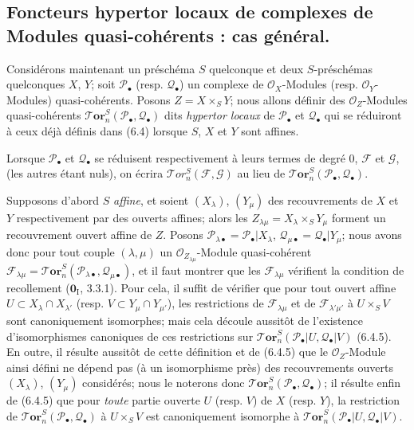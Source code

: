 \subsection{Foncteurs hypertor locaux de complexes de Modules quasi-cohérents : cas général.}

\begin{env}[6.5.1]
Considérons maintenant un préschéma $S$ quelconque et deux $S$-préschémas
quelconques $X$, $Y$; soit $\mathscr P_\bullet$ (resp. $\mathscr Q_\bullet$)
un complexe de $\mathscr O_X$-Modules (resp. $\mathscr O_Y$-Modules)
quasi-cohérents. Posons $Z=X\times_S Y$; nous allons définir des
$\mathscr O_Z$-Modules quasi-cohérents
$\boldsymbol{\mathscr{T}\!or}_n^S(\mathscr P_\bullet,\mathscr Q_\bullet)$ dits
\emph{hypertor locaux} de $\mathscr P_\bullet$ et $\mathscr Q_\bullet$ qui se
réduiront à ceux déjà définis dans (6.4) lorsque $S$, $X$ et $Y$ sont affines.

Lorsque $\mathscr P_\bullet$ et $\mathscr Q_\bullet$ se réduisent
respectivement à leurs termes de degré 0, $\mathscr F$ et $\mathscr G$, (les
autres étant nuls), on écrira
$\mathscr{T}\!or_n^S(\mathscr F,\mathscr G)$ au lieu de
$\boldsymbol{\mathscr{T}\!or}_n^S(\mathscr P_\bullet,\mathscr Q_\bullet)$.
\end{env}

\begin{env}[6.5.2]
Supposons d'abord $S$ \emph{affine}, et soient $(X_\lambda)$, $(Y_\mu)$ des
recouvrements de $X$ et $Y$ respectivement par des ouverts affines; alors les
$Z_{\lambda\mu}=X_\lambda\times_S Y_\mu$ forment un recouvrement ouvert affine
de $Z$. Posons
$\mathscr P_{\lambda\bullet}=\mathscr P_\bullet|X_\lambda$,
$\mathscr Q_{\mu\bullet}=\mathscr Q_\bullet|Y_\mu$; nous avons donc pour tout
couple $(\lambda,\mu)$ un $\mathscr O_{Z_{\lambda\mu}}$-Module quasi-cohérent
$\mathscr F_{\lambda\mu}
  =\boldsymbol{\mathscr{T}\!or}_n^S
   (\mathscr P_{\lambda\bullet},\mathscr Q_{\mu\bullet})$,
et il faut montrer que les $\mathscr F_{\lambda\mu}$ vérifient la condition de
recollement ($\mathbf{0}_{\mathrm I}$, 3.3.1). Pour cela, il suffit de vérifier que pour
tout ouvert affine $U\subset X_\lambda\cap X_{\lambda'}$ (resp.
$V\subset Y_\mu\cap Y_{\mu'}$), les restrictions de
$\mathscr F_{\lambda\mu}$ et de $\mathscr F_{\lambda'\mu'}$ à $U\times_S V$
sont canoniquement isomorphes; mais cela découle aussitôt de l'existence
d'isomorphismes canoniques de ces restrictions sur
$\boldsymbol{\mathscr{T}\!or}_n^S(\mathscr P_\bullet|U,\mathscr Q_\bullet|V)$ (6.4.5). En
outre, il résulte aussitôt de cette définition et de (6.4.5) que le
$\mathscr O_Z$-Module ainsi défini ne dépend pas (à un isomorphisme près) des
recouvrements ouverts $(X_\lambda)$, $(Y_\mu)$ considérés;
nous le noterons donc
$\boldsymbol{\mathscr{T}\!or}_n^S(\mathscr P_\bullet,\mathscr Q_\bullet)$; il résulte enfin
de (6.4.5) que pour \emph{toute} partie ouverte $U$ (resp. $V$) de $X$ (resp. $Y$), la
restriction de $\boldsymbol{\mathscr{T}\!or}_n^S(\mathscr P_\bullet,\mathscr Q_\bullet)$ à
$U\times_S V$ est canoniquement isomorphe à
$\boldsymbol{\mathscr{T}\!or}_n^S(\mathscr P_\bullet|U,\mathscr Q_\bullet|V)$.
\end{env}

